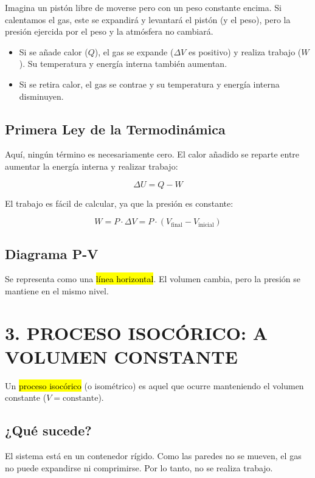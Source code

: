 \documentclass{article}
\begin{document}
Imagina un pistón libre de moverse pero con un peso constante encima. Si calentamos el gas, este se expandirá y levantará el pistón (y el peso), pero la presión ejercida por el peso y la atmósfera no cambiará.

\begin{itemize}
    \item Si se añade calor ($Q$), el gas se expande ($\Delta V$ es positivo) y realiza trabajo ($W$). Su temperatura y energía interna también aumentan.
    \item Si se retira calor, el gas se contrae y su temperatura y energía interna disminuyen.
\end{itemize}

\subsection*{Primera Ley de la Termodinámica}

Aquí, ningún término es necesariamente cero. El calor añadido se reparte entre aumentar la energía interna y realizar trabajo:

$$\Delta U = Q - W$$

El trabajo es fácil de calcular, ya que la presión es constante:

$$W = P \cdot \Delta V = P \cdot (V_{\text{final}} - V_{\text{inicial}})$$

\subsection*{Diagrama P-V}

Se representa como una \hl{línea horizontal}. El volumen cambia, pero la presión se mantiene en el mismo nivel.

\vspace{5mm}

\section*{3. PROCESO ISOCÓRICO: A VOLUMEN CONSTANTE}

Un \hl{proceso isocórico} (o isométrico) es aquel que ocurre manteniendo el volumen constante ($V = \text{constante}$).

\subsection*{¿Qué sucede?}

El sistema está en un contenedor rígido. Como las paredes no se mueven, el gas no puede expandirse ni comprimirse. Por lo tanto, no se realiza trabajo.
\end{document}
